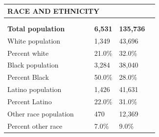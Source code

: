 \documentclass[9pt]{report}
\begin{document}
\vspace{12pt}
\setlength{\tabcolsep}{.01in} %
\begin{tabular}{p{.10in}p{.10in}p{.10in}p{3.7in}>{\hfill}p{.85in}>{\hfill}p{.85in}>{\hfill}p{.85in}>{\hfill}p{.85in}p{0.1in}}
\multicolumn{9}{l}{\parbox{7.1in}{\raggedright{\large{\strut\textbf{RACE AND ETHNICITY}\strut}}}} \\ 
\hline
\multicolumn{4}{l}{\parbox{3.5in}{\raggedright{\textbf{}}}} & \multicolumn{1}{r}{\parbox{.85in}{\strut\raggedleft{\textbf{}\strut}}} & \multicolumn{1}{r}{\parbox{.85in}{\strut\raggedleft{\textbf{}\strut}}} & \multicolumn{1}{r}{\parbox{.85in}{\strut{}}} & \multicolumn{1}{r}{\parbox{.85in}{\strut{}}} & \\ 
\multicolumn{9}{l}{} \\ 
\multicolumn{4}{l}{\parbox{3.5in}{\strut\raggedright{\textbf{Total population}\strut}}} & \textbf{} & \textbf{} & \textbf{6,531} & \textbf{135,736} & \textbf{} \\ 
\multicolumn{4}{l}{\parbox{3.6in}{\strut\raggedright{{White population}}\strut}} &  &  & 1,349 & 43,696 & \multicolumn{1}{l}{}  \\ 
\multicolumn{4}{l}{\parbox{3.6in}{\strut\raggedright{{Percent white}}\strut}} &  &  & 21.0\% & 32.0\% & \multicolumn{1}{l}{}  \\ 
\multicolumn{4}{l}{\parbox{3.6in}{\strut\raggedright{{Black population}}\strut}} &  &  & 3,284 & 38,040 & \multicolumn{1}{l}{}  \\ 
\multicolumn{4}{l}{\parbox{3.6in}{\strut\raggedright{{Percent Black}}\strut}} &  &  & 50.0\% & 28.0\% & \multicolumn{1}{l}{}  \\ 
\multicolumn{4}{l}{\parbox{3.6in}{\strut\raggedright{{Latino population}}\strut}} &  &  & 1,426 & 41,631 & \multicolumn{1}{l}{}  \\ 
\multicolumn{4}{l}{\parbox{3.6in}{\strut\raggedright{{Percent Latino}}\strut}} &  &  & 22.0\% & 31.0\% & \multicolumn{1}{l}{}  \\ 
\multicolumn{4}{l}{\parbox{3.6in}{\strut\raggedright{{Other race population}}\strut}} &  &  & 470 & 12,369 & \multicolumn{1}{l}{}  \\ 
\multicolumn{4}{l}{\parbox{3.6in}{\strut\raggedright{{Percent other race}}\strut}} &  &  & 7.0\% & 9.0\% & \multicolumn{1}{l}{}  \\ 

\end{tabular}
\setlength{\tabcolsep}{6pt} %
\end{document}
